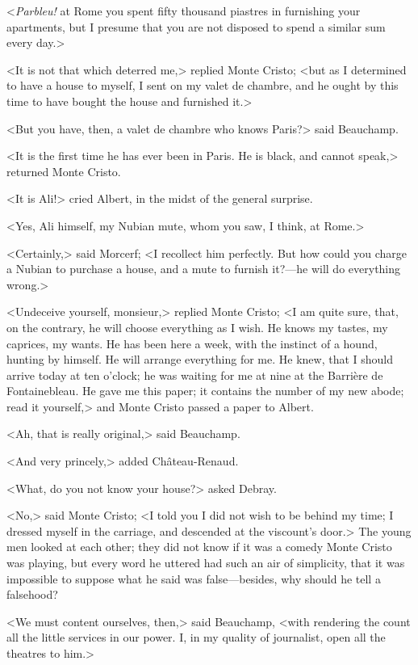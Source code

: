  <\textit{Parbleu!} at Rome you spent fifty thousand piastres in furnishing your apartments, but I presume that you are not disposed to spend a similar sum every day.> 

 <It is not that which deterred me,> replied Monte Cristo; <but as I determined to have a house to myself, I sent on my valet de chambre, and he ought by this time to have bought the house and furnished it.> 

 <But you have, then, a valet de chambre who knows Paris?> said Beauchamp. 

 <It is the first time he has ever been in Paris. He is black, and cannot speak,> returned Monte Cristo. 

 <It is Ali!> cried Albert, in the midst of the general surprise. 

 <Yes, Ali himself, my Nubian mute, whom you saw, I think, at Rome.> 

 <Certainly,> said Morcerf; <I recollect him perfectly. But how could you charge a Nubian to purchase a house, and a mute to furnish it?—he will do everything wrong.> 

 <Undeceive yourself, monsieur,> replied Monte Cristo; <I am quite sure, that, on the contrary, he will choose everything as I wish. He knows my tastes, my caprices, my wants. He has been here a week, with the instinct of a hound, hunting by himself. He will arrange everything for me. He knew, that I should arrive today at ten o'clock; he was waiting for me at nine at the Barrière de Fontainebleau. He gave me this paper; it contains the number of my new abode; read it yourself,> and Monte Cristo passed a paper to Albert. 

 <Ah, that is really original,> said Beauchamp. 

 <And very princely,> added Château-Renaud. 

 <What, do you not know your house?> asked Debray. 

 <No,> said Monte Cristo; <I told you I did not wish to be behind my time; I dressed myself in the carriage, and descended at the viscount's door.> The young men looked at each other; they did not know if it was a comedy Monte Cristo was playing, but every word he uttered had such an air of simplicity, that it was impossible to suppose what he said was false—besides, why should he tell a falsehood? 

 <We must content ourselves, then,> said Beauchamp, <with rendering the count all the little services in our power. I, in my quality of journalist, open all the theatres to him.> 

